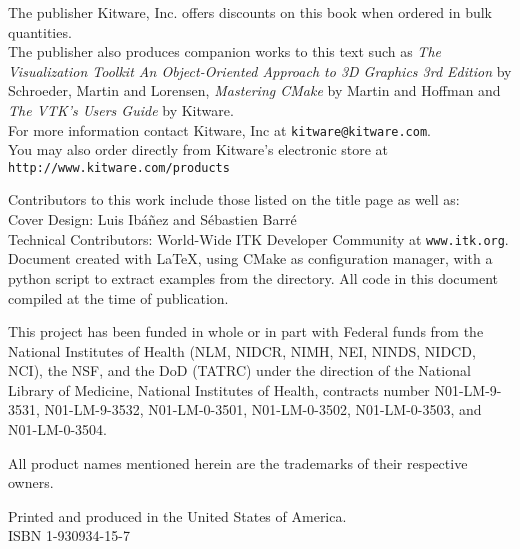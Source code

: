 \begin{minipage}[t][3.2cm][b]{\textwidth}
\begin{center}
The publisher Kitware, Inc. offers discounts on this book when ordered in
bulk quantities.\\
The publisher also produces companion works to this text such as \emph{The
Visualization Toolkit An Object-Oriented Approach to 3D Graphics 3rd Edition}
by Schroeder, Martin and Lorensen, \emph{Mastering CMake} by Martin and
Hoffman and \emph{The VTK's Users Guide} by Kitware.\\
For more information contact Kitware, Inc at \texttt{kitware@kitware.com}.\\
You may also order directly from Kitware's electronic store at
\texttt{http://www.kitware.com/products}\\
\end{center}
\end{minipage}

\begin{minipage}[t][2.7cm][b]{\textwidth}
\begin{center}
Contributors to this work include those listed on the title page as well
as:\\ Cover Design: Luis Ib\'{a}\~{n}ez and S\'{e}bastien Barr\'{e}\\
Technical Contributors: World-Wide ITK Developer Community at
\texttt{www.itk.org}. \\Document created with \LaTeX{}, using CMake as
configuration manager, with a python script to extract examples from the
 directory. All code in this document compiled at
the time of publication.
\end{center}
\end{minipage}


\begin{minipage}[t][2.5cm][b]{\textwidth}
\begin{center}
This project has been funded in whole or in part with Federal funds from the
National Institutes of Health (NLM, NIDCR, NIMH, NEI, NINDS, NIDCD, NCI), the
NSF, and the DoD (TATRC) under the direction of the National Library of
Medicine, National Institutes of Health, contracts number N01-LM-9-3531,
N01-LM-9-3532, N01-LM-0-3501, N01-LM-0-3502, N01-LM-0-3503, and
N01-LM-0-3504.
\end{center}
\end{minipage}


\begin{minipage}[t][1.0cm][b]{\textwidth}
\begin{center}
All product names mentioned herein are the trademarks of their respective 
owners.
\end{center}
\end{minipage}


\begin{minipage}[t][1.0cm][b]{\textwidth}
\begin{center}
Printed and produced in the United States of America.\\
ISBN 1-930934-15-7
\end{center}
\end{minipage}
